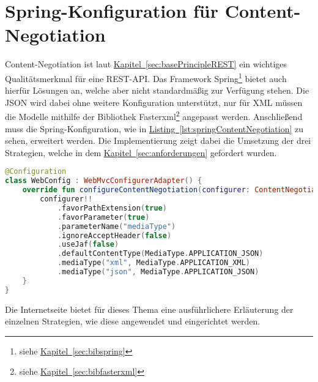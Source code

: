 \section{Spring-Konfiguration für Content-Negotiation}\label{sec:contentNegotiation}
Content-Negotiation ist laut \hyperref[sec:basePrincipleREST]{Kapitel~\ref{sec:basePrincipleREST}} ein wichtiges Qualitätsmerkmal für eine \gls{REST}-\gls{API}. Das Framework Spring\footnote{siehe \hyperref[sec:bibspring]{Kapitel~\ref{sec:bibspring}}} bietet auch hierfür Lösungen an, welche aber nicht standardmäßig zur Verfügung stehen. Die \gls{JSON} wird dabei ohne weitere Konfiguration unterstützt, nur für \gls{XML} müssen die Modelle mithilfe der Bibliothek Fasterxml\footnote{siehe \hyperref[sec:bibfasterxml]{Kapitel~\ref{sec:bibfasterxml}}} angepasst werden. Anschließend muss die Spring-Konfiguration, wie in \hyperref[lst:springContentNegotiation]{Listing~\ref{lst:springContentNegotiation}} zu sehen, erweitert werden. Die Implementierung zeigt dabei die Umsetzung der drei Strategien, welche in dem \hyperref[sec:anforderungen]{Kapitel~\ref{sec:anforderungen}} gefordert wurden.
\begin{lstlisting}[style=lstStyleFramed, language=Kotlin, caption={Spring-Konfiguration der drei Content-Negotiation-Strategien}, label=lst:springContentNegotiation, float]
@Configuration
class WebConfig : WebMvcConfigurerAdapter() {
	override fun configureContentNegotiation(configurer: ContentNegotiationConfigurer?) {
		configurer!!
			.favorPathExtension(true)
			.favorParameter(true)
			.parameterName("mediaType")
			.ignoreAcceptHeader(false)
			.useJaf(false)
			.defaultContentType(MediaType.APPLICATION_JSON)
			.mediaType("xml", MediaType.APPLICATION_XML)
			.mediaType("json", MediaType.APPLICATION_JSON)
	}
}
\end{lstlisting}
Die Internetseite \cite{springContentNegotiation} bietet für dieses Thema eine ausführlichere Erläuterung der einzelnen Strategien, wie diese angewendet und eingerichtet werden.

